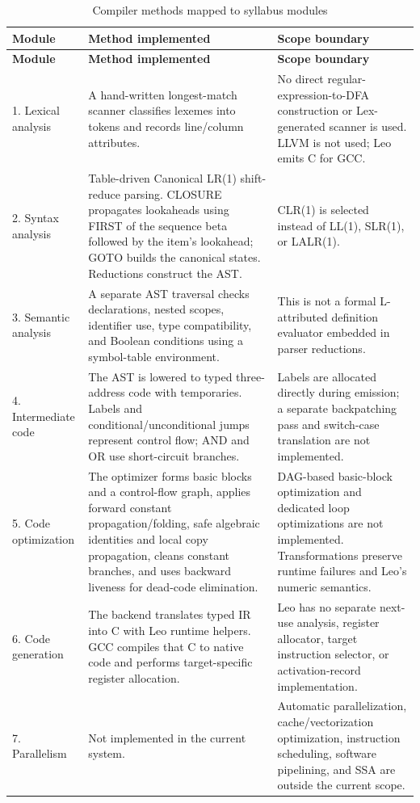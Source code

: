 \documentclass[12pt,a4paper,oneside]{report}
\begin{document}
\begin{longtable}{p{}p{}p{}}
\caption{Compiler methods mapped to syllabus modules}\\
\toprule
\textbf{Module} & \textbf{Method implemented} & \textbf{Scope boundary}\\
\midrule
\endfirsthead
\toprule
\textbf{Module} & \textbf{Method implemented} & \textbf{Scope boundary}\\
\midrule
\endhead
1. Lexical analysis & A hand-written longest-match scanner classifies lexemes into tokens and records line/column attributes. & No direct regular-expression-to-DFA construction or Lex-generated scanner is used. LLVM is not used; Leo emits C for GCC.\\
2. Syntax analysis & Table-driven Canonical LR(1) shift-reduce parsing. CLOSURE propagates lookaheads using FIRST of the sequence beta followed by the item's lookahead; GOTO builds the canonical states. Reductions construct the AST. & CLR(1) is selected instead of LL(1), SLR(1), or LALR(1).\\
3. Semantic analysis & A separate AST traversal checks declarations, nested scopes, identifier use, type compatibility, and Boolean conditions using a symbol-table environment. & This is not a formal L-attributed definition evaluator embedded in parser reductions.\\
4. Intermediate code & The AST is lowered to typed three-address code with temporaries. Labels and conditional/unconditional jumps represent control flow; AND and OR use short-circuit branches. & Labels are allocated directly during emission; a separate backpatching pass and switch-case translation are not implemented.\\
5. Code optimization & The optimizer forms basic blocks and a control-flow graph, applies forward constant propagation/folding, safe algebraic identities and local copy propagation, cleans constant branches, and uses backward liveness for dead-code elimination. & DAG-based basic-block optimization and dedicated loop optimizations are not implemented. Transformations preserve runtime failures and Leo's numeric semantics.\\
6. Code generation & The backend translates typed IR into C with Leo runtime helpers. GCC compiles that C to native code and performs target-specific register allocation. & Leo has no separate next-use analysis, register allocator, target instruction selector, or activation-record implementation.\\
7. Parallelism & Not implemented in the current system. & Automatic parallelization, cache/vectorization optimization, instruction scheduling, software pipelining, and SSA are outside the current scope.\\
\bottomrule
\end{longtable}
\end{document}
